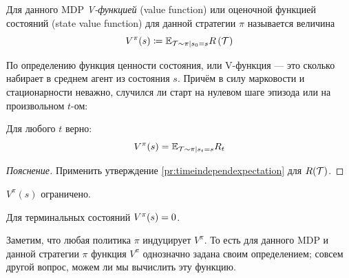 \begin{definition} 
Для данного MDP \emph{V-функцией} (value function) или оценочной функцией состояний (state value function) для данной стратегии $\pi$ называется величина 
\begin{equation}\label{Vdefinition}
V^\pi(s) \coloneqq \mathbb{E}_{\mathcal{T} \sim \pi \mid s_0 = s} R \left( \mathcal{T} \right)
\end{equation}
\end{definition}

По определению функция ценности состояния, или V-функция --- это сколько набирает в среднем агент из состояния $s$. Причём в силу марковости и стационарности неважно, случился ли старт на нулевом шаге эпизода или на произвольном $t$-ом:

\begin{proposition}\label{Vtimeindepend}
Для любого $t$ верно:
$$V^\pi(s) = \mathbb{E}_{\mathcal{T} \sim \pi \mid s_t = s} R_t$$
\begin{proof}[Пояснение] Применить утверждение \ref{pr:timeindependexpectation} для $R(\mathcal{T})$.
\end{proof}
\end{proposition}

\begin{proposition}
$V^\pi(s)$ ограничено.
\end{proposition}

\begin{proposition}
Для терминальных состояний $V^\pi(s) \HM= 0$.
\end{proposition}

Заметим, что любая политика $\pi$ индуцирует $V^\pi$. То есть для данного MDP и данной стратегии $\pi$ функция $V^\pi$ однозначно задана своим определением; совсем другой вопрос, можем ли мы вычислить эту функцию.

